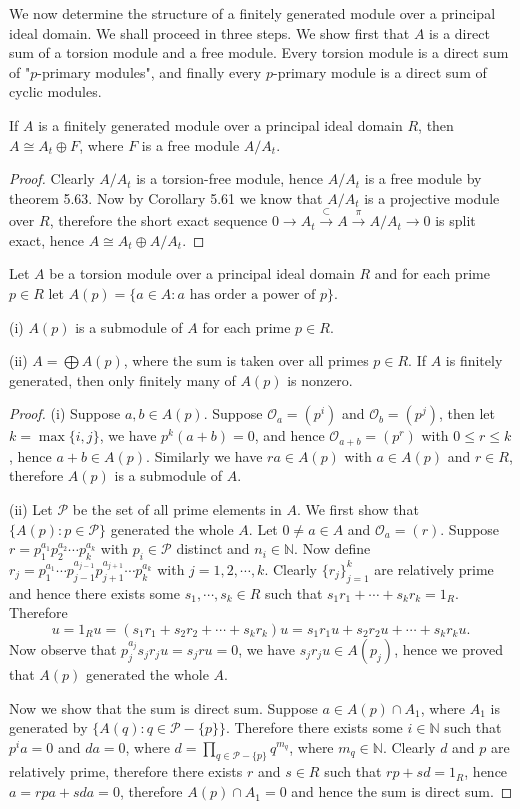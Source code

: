We now determine the structure of a finitely generated module over a principal ideal domain. We shall proceed in three steps. We show first that $A$ is a direct sum of a torsion module and a free module. Every torsion module is a direct sum of "$p$-primary modules", and finally every $p$-primary module is a direct sum of cyclic modules.
\begin{theorem}
If $A$ is a finitely generated module over a principal ideal domain $R$, then $A\cong A_t\oplus F$, where $F$ is a free module $A/A_t$.
\end{theorem}
\begin{proof}
Clearly $A/A_t$ is a torsion-free module, hence $A/A_t$ is a free module by theorem 5.63. Now by Corollary 5.61 we know that $A/A_t$ is a projective module over $R$, therefore the short exact sequence $0\longrightarrow A_t\overset{\subset}{\longrightarrow}A\overset{\pi}{\longrightarrow}A/A_t\longrightarrow 0$ is split exact, hence $A\cong A_t\oplus A/A_t$.
\end{proof}
\begin{theorem}
Let $A$ be a torsion module over a principal ideal domain $R$ and for each prime $p\in R$ let $A(p)=\{a\in A:\text{$a$ has order a power of $p$}\}$.\par
(i) $A(p)$ is a submodule of $A$ for each prime $p\in R$.\par
(ii) $A=\bigoplus A(p)$, where the sum is taken over all primes $p\in R$. If $A$ is finitely generated, then only finitely many of $A(p)$ is nonzero.
\end{theorem}
\begin{proof}
(i) Suppose $a,b\in A(p)$. Suppose $\mathcal{O}_a=(p^i)$ and $\mathcal{O}_b=(p^j)$, then let $k=\max\{i,j\}$, we have $p^k(a+b)=0$, and hence $\mathcal{O}_{a+b}=(p^r)$ with $0\le r\le k$, hence $a+b\in A(p)$. Similarly we have $ra\in A(p)$ with $a\in A(p)$ and $r\in R$, therefore $A(p)$ is a submodule of $A$.\par
(ii) Let $\mathcal{P}$ be the set of all prime elements in $A$. We first show that $\{A(p):p\in\mathcal{P}\}$ generated the whole $A$. Let $0\ne a\in A$ and $\mathcal{O}_a=(r)$. Suppose $r=p_{1}^{a_1}p_{2}^{a_2}\cdots p_{k}^{a_k}$ with $p_i\in\mathcal{P}$ distinct and $n_i\in\mathbb{N}$. Now define $r_j=p_{1}^{a_1}\cdots p_{j-1}^{a_{j-1}}p_{j+1}^{a_{j+1}}\cdots p_{k}^{a_k}$ with $j=1,2,\cdots,k$. Clearly $\{r_j\}_{j=1}^k$ are relatively prime and hence there exists some $s_1,\cdots,s_k\in R$ such that $s_1r_1+\cdots+s_kr_k=1_R$. Therefore 
$$
u=1_Ru=\left( s_1r_1+s_2r_2+\cdots +s_kr_k \right) u=s_1r_1u+s_2r_2u+\cdots +s_kr_ku.
$$
Now observe that $p_{j}^{a_j}s_jr_ju=s_jru=0$, we have $s_jr_ju\in A(p_j)$, hence we proved that $A(p)$ generated the whole $A$.\par
Now we show that the sum is direct sum. Suppose $a\in A(p)\cap A_1$, where $A_1$ is generated by $\{A(q):q\in\mathcal{P}-\{p\}\}$. Therefore there exists some $i\in\mathbb{N}$ such that $p^ia=0$ and $da=0$, where $d=\prod_{q\in\mathcal{P}-\{p\}}q^{m_q}$, where $m_q\in\mathbb{N}$. Clearly $d$ and $p$ are relatively prime, therefore there exists $r$ and $s\in R$ such that $rp+sd=1_R$, hence $a=rpa+sda=0$, therefore $A(p)\cap A_1=0$ and hence the sum is direct sum.
\end{proof}
